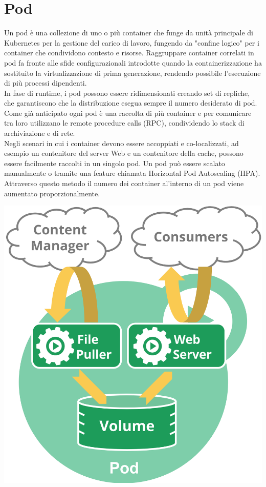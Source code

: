 \documentclass[12pt, a4paper]{report}
\begin{document}
\section{Pod}
Un pod è una collezione di uno o più container che funge da unità principale di Kubernetes per la gestione del carico di lavoro, fungendo da "confine logico" per i container che condividono contesto e risorse. Raggruppare container correlati in pod fa fronte alle sfide configurazionali introdotte quando la containerizzazione ha sostituito la virtualizzazione di prima generazione, rendendo possibile l'esecuzione di più processi dipendenti.\\In fase di runtime, i pod possono essere ridimensionati creando set di repliche, che garantiscono che la distribuzione esegua sempre il numero desiderato di pod. Come già anticipato ogni pod è una raccolta di più container e per comunicare tra loro utilizzano le remote procedure calls (RPC), condividendo lo stack di archiviazione e di rete.\\
Negli scenari in cui i container devono essere accoppiati e co-localizzati, ad esempio un contenitore del server Web e un contenitore della cache, possono essere facilmente raccolti in un singolo pod. Un pod può essere scalato manualmente o tramite una feature chiamata Horizontal Pod Autoscaling (HPA).\\
Attraverso questo metodo il numero dei container al'interno di un pod viene aumentato proporzionalmente.
\begin{center}
  \includegraphics[scale=0.3]{Images/Kubernetes-pod}
\end{center}
\end{document}
